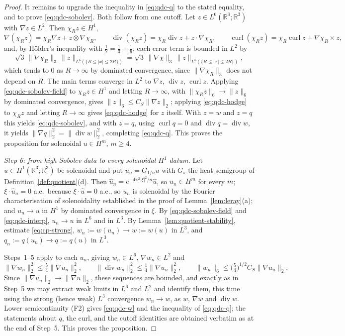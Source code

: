 \documentclass[11pt]{article}
\theoremstyle{definition}
\theoremstyle{plain}
\newcommand{\R}{\mathbb R}
\newcommand{\norm}[1]{\lVert #1\rVert}
\begin{document}
\begin{proof}
It remains to upgrade the inequality in \eqref{eq:qdc-q} to the stated
equality, and to prove \eqref{eq:qdc-sobolev}.  Both follow from one cutoff.
Let $z\in L^6(\R^3;\R^3)$ with $\nabla z\in L^2$.  Then $\chi_Rz\in H^1$,
\[
 \nabla(\chi_Rz)=\chi_R\nabla z+z\otimes\nabla\chi_R,
 \qquad
 \operatorname{div}(\chi_Rz)=\chi_R\operatorname{div}z+z\cdot\nabla\chi_R,
 \qquad
 \operatorname{curl}(\chi_Rz)=\chi_R\operatorname{curl}z+\nabla\chi_R\times z,
\]
and, by H\"older's inequality with $\frac12=\frac13+\frac16$, each error
term is bounded in $L^2$ by
\[
 \sqrt3\,\norm{\nabla\chi_R}_3\,\norm z_{L^6(\{R\le|x|\le2R\})}
 =\sqrt3\,\norm{\nabla\chi}_3\,\norm z_{L^6(\{R\le|x|\le2R\})},
\]
which tends to $0$ as $R\to\infty$ by dominated convergence, since
$\norm{\nabla\chi_R}_3$ does not depend on $R$.  The main terms converge in $L^2$ to $\nabla z$,
$\operatorname{div}z$, $\operatorname{curl}z$.  Applying
\eqref{eq:qdc-sobolev-field} to $\chi_Rz\in H^1$ and letting $R\to\infty$,
with $\norm{\chi_Rz}_6\to\norm z_6$ by dominated convergence, gives
$\norm z_6\le C_S\norm{\nabla z}_2$; applying \eqref{eq:qdc-hodge} to
$\chi_Rz$ and letting $R\to\infty$ gives \eqref{eq:qdc-hodge} for $z$ itself.
With $z=w$ and $z=q$ this yields \eqref{eq:qdc-sobolev}, and with $z=q$,
using $\operatorname{curl}q=0$ and $\operatorname{div}q=\operatorname{div}w$,
it yields $\norm{\nabla q}_2^2=\norm{\operatorname{div}w}_2^2$, completing
\eqref{eq:qdc-q}.  This proves the proposition for solenoidal $u\in H^m$,
$m\ge4$.

\emph{Step 6: from high Sobolev data to every solenoidal $H^1$ datum.}  Let
$u\in H^1(\R^3;\R^3)$ be solenoidal and put $u_n=G_{1/n}u$ with $G_s$ the
heat semigroup of Definition~\ref{def:quotient}(d).  Then
$\hat u_n=e^{-4\pi^2|\xi|^2/n}\hat u$, so $u_n\in H^m$ for every $m$;
$\xi\cdot\hat u_n=0$ a.e.\ because $\xi\cdot\hat u=0$ a.e., so $u_n$ is
solenoidal by the Fourier characterisation of solenoidality established in
the proof of Lemma~\ref{lem:leray}(a); and $u_n\to u$ in $H^1$ by dominated
convergence in $\xi$.  By \eqref{eq:qdc-sobolev-field} and
\eqref{eq:qdc-interp}, $u_n\to u$ in $L^6$ and in $L^3$.  By
Lemma~\ref{lem:quotient-stability}, estimate \eqref{eq:cp-strong},
$w_n:=w(u_n)\to w:=w(u)$ in $L^3$, and $q_n:=q(u_n)\to q:=q(u)$ in $L^3$.

Steps~1--5 apply to each $u_n$, giving $w_n\in L^6$, $\nabla w_n\in L^2$ and
\[
 \norm{\nabla w_n}_2^2\le\tfrac54\norm{\nabla u_n}_2^2,
 \qquad
 \norm{\operatorname{div}w_n}_2^2\le\tfrac14\norm{\nabla u_n}_2^2,
 \qquad
 \norm{w_n}_6\le\bigl(\tfrac54\bigr)^{1/2}C_S\norm{\nabla u_n}_2 .
\]
Since $\norm{\nabla u_n}_2\to\norm{\nabla u}_2$, these sequences are bounded,
and exactly as in Step~5 we may extract weak limits in $L^6$ and $L^2$ and
identify them, this time using the strong (hence weak) $L^3$ convergence
$w_n\to w$, as $w$, $\nabla w$ and $\operatorname{div}w$.  Lower
semicontinuity (F2) gives \eqref{eq:qdc-w} and the inequality of
\eqref{eq:qdc-q}; the statements about $q$, the curl, and the cutoff
identities are obtained verbatim as at the end of Step~5.  This proves the
proposition.
\end{proof}
\end{document}
